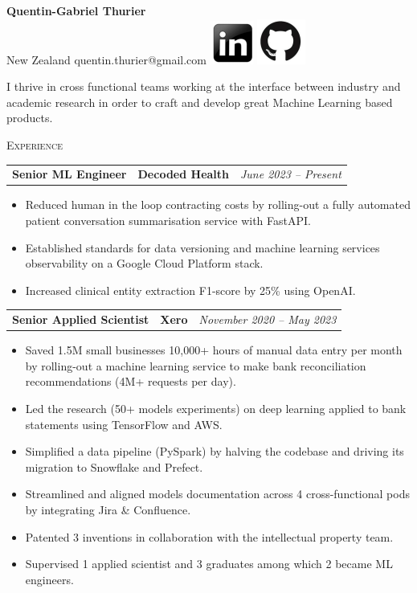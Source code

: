 \documentclass[letterpaper,11pt]{article}
\renewcommand{\section}[1]{
  {\scshape\color{blue}#1}{\color{blue}\hrulefill}{\vspace{0.2cm}}
}
\newcommand{\resumeItem}[1]{
  \item\small{#1 \vspace{-6pt}}
}
\newcommand{\resumeItemListStart}{\begin{itemize}[label=$\circ$, topsep=0.2cm, leftmargin=0.4cm]}
\newcommand{\resumeItemListEnd}{\end{itemize}\vspace{8pt}}
\newcommand{\job}[4]{
    \begin{tabular}{p{7cm}p{6cm}p{5cm}}
      \hspace{-0.7em} \textbf{#1} & \textbf{\small{#2}} & \hfill \textit{\small{#4}}
    \end{tabular}
}
\begin{document}
 

\begin{center}
  \textbf{\Large Quentin-Gabriel Thurier} \\
  \small{New Zealand} \textbar{}
  \small{quentin.thurier@gmail.com} \textbar{}
  \href{https://www.linkedin.com/in/quentin-gabriel-thurier-36586021/}{\includegraphics[scale=0.6,valign=b]{linkedin}} \href{https://github.com/qthurier}{\includegraphics[scale=0.6, valign=b]{github}} 
\end{center}

I thrive in cross functional teams working at the interface between industry and academic research in order to craft and develop great Machine Learning based products. 

{\vspace{0.3cm}}

\section{Experience}
\job {Senior ML Engineer}{Decoded Health}{Auckland}{June 2023 -- Present}
\resumeItemListStart
\resumeItem {Reduced human in the loop contracting costs by rolling-out a fully automated patient conversation summarisation service with FastAPI.}
\resumeItem {Established standards for data versioning and machine learning services observability on a Google Cloud Platform stack.}
\resumeItem {Increased clinical entity extraction F1-score by 25\% using OpenAI.}
\resumeItemListEnd

\job {Senior Applied Scientist}{Xero}{Auckland}{November 2020 -- May 2023}
\resumeItemListStart
\resumeItem {Saved 1.5M small businesses 10,000+ hours of manual data entry per month by rolling-out a machine learning service to make bank reconciliation recommendations (4M+ requests per day).}
\resumeItem {Led the research (50+ models experiments) on deep learning applied to bank statements using TensorFlow and AWS.}
\resumeItem {Simplified a data pipeline (PySpark) by halving the codebase and driving its migration to Snowflake and Prefect.}
\resumeItem {Streamlined and aligned models documentation across 4 cross-functional pods by integrating Jira \& Confluence.}
\resumeItem {Patented 3 inventions in collaboration with the intellectual property team.}
\resumeItem {Supervised 1 applied scientist and 3 graduates among which 2 became ML engineers.}
\resumeItemListEnd
\end{document}
